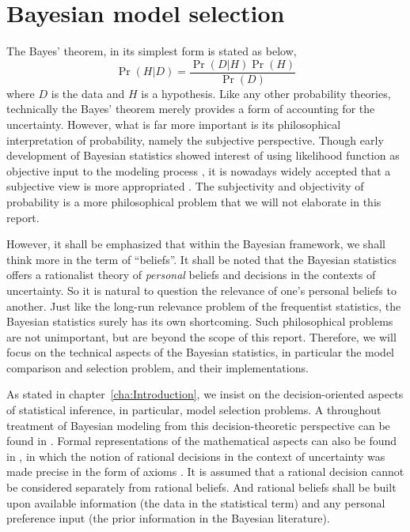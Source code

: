 \chapter{Bayesian model selection}
\label{cha:Bayesian model selection}

The Bayes' theorem, in its simplest form is stated as below,
\begin{equation}
  \Pr(H|D) = \frac{\Pr(D|H)\Pr(H)}{\Pr(D)}
  \label{eq:bayes}
\end{equation}
where $D$ is the data and $H$ is a hypothesis. Like any other probability
theories, technically the Bayes' theorem merely provides a form of accounting
for the uncertainty. However, what is far more important is its philosophical
interpretation of probability, namely the subjective perspective. Though early
development of Bayesian statistics showed interest of using likelihood
function as objective input to the modeling process \parencite{Jeffreys1961,
  Jeffreys1946}, it is nowadays widely accepted that a subjective view is more
appropriated \parencite[][chap.~1]{Bernardo2000}. The subjectivity and
objectivity of probability is a more philosophical problem that we will not
elaborate in this report.

However, it shall be emphasized that within the Bayesian framework, we shall
think more in the term of ``beliefs''. It shall be noted that the Bayesian
statistics offers a rationalist theory of \emph{personal} beliefs and
decisions in the contexts of uncertainty. So it is natural to question the
relevance of one's personal beliefs to another. Just like the long-run
relevance problem of the frequentist statistics, the Bayesian statistics
surely has its own shortcoming. Such philosophical problems are not
unimportant, but are beyond the scope of this report. Therefore, we will focus
on the technical aspects of the Bayesian statistics, in particular the model
comparison and selection problem, and their implementations.

As stated in chapter~\ref{cha:Introduction}, we insist on the
decision-oriented aspects of statistical inference, in particular, model
selection problems. A throughout treatment of Bayesian modeling from this
decision-theoretic perspective can be found in \textcite{Robert2007}. Formal
representations of the mathematical aspects can also be found in
\textcite[][sec.~5.1 and sec.~6.1]{Bernardo2000}, in which the notion of
rational decisions in the context of uncertainty was made precise in the form
of axioms \parencite[][chap.~2]{Bernardo2000}. It is assumed that a rational
decision cannot be considered separately from rational beliefs. And rational
beliefs shall be built upon available information (the data in the statistical
term) and any personal preference input (the prior information in the Bayesian
literature).

